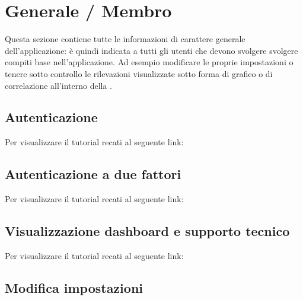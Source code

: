 \section{Generale / Membro}
Questa sezione contiene tutte le informazioni di carattere generale dell'applicazione: è quindi indicata a tutti gli utenti che devono svolgere svolgere compiti base nell'applicazione. Ad esempio modificare le proprie impostazioni o tenere sotto controllo le rilevazioni visualizzate sotto forma di grafico o di correlazione all'interno della .

\subsection{Autenticazione}
Per visualizzare il tutorial recati al seguente link: 
\url{}

\subsection{Autenticazione a due fattori}
Per visualizzare il tutorial recati al seguente link: 
\url{}

\subsection{Visualizzazione dashboard e supporto tecnico}
Per visualizzare il tutorial recati al seguente link: 
\url{}

\subsection{Modifica impostazioni}
\url{}

